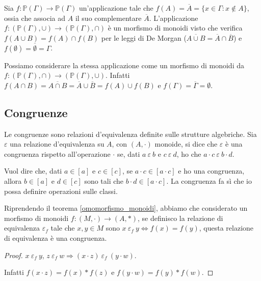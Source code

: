 \begin{exmp}
Sia $f : \mathbb{P}(\Gamma) \to \mathbb{P}(\Gamma)$ un'applicazione tale che $f(A) = \overline{A} = \{ x \in \Gamma : x \notin A\}$, ossia che associa ad $A$ il suo complementare $\overline{A}$. L'applicazione $f : (\mathbb{P}(\Gamma), \cup) \to (\mathbb{P}(\Gamma), \cap)$ \`e un morfismo di monoidi visto che verifica $f(A \cup B) = f(A) \cap f(B)$ per le leggi di De Morgan ($\overline{A \cup B} = \overline{A} \cap \overline{B}$) e $f(\emptyset) = \overline{\emptyset} = \Gamma$.

Possiamo considerare la stessa applicazione come un morfismo di monoidi da $f : (\mathbb{P}(\Gamma), \cap) \to (\mathbb{P}(\Gamma), \cup)$. Infatti $f(A \cap B) = \overline{A \cap B} = \overline{A} \cup \overline{B} = f(A) \cup f(B)$ e $f(\Gamma) = \overline{\Gamma} = \emptyset$.
\end{exmp}

\subsection{Congruenze\label{congruenze}}

\begin{defn}
Le congruenze sono relazioni d'equivalenza definite sulle strutture algebriche. Sia $\varepsilon$ una relazione d'equivalenza su $A$, con $(A, \cdot)$ monoide, si dice che $\varepsilon$ \`e una congruenza rispetto all'operazione $\cdot$ se, dati $a \ \varepsilon \ b$ e $c \ \varepsilon \ d$, ho che $a \cdot c \ \varepsilon \ b \cdot d$.
\end{defn}

Vuol dire che, dati $a \in [a]$ e $c \in [c]$, se $a \cdot c \in [a \cdot c]$ e ho una congruenza, allora $b \in [a]$ e $d \in [c]$ sono tali che $b \cdot d \in [a \cdot c]$. La congruenza fa s\`i che io possa definire operazioni sulle classi.

\begin{prop}
Riprendendo il teorema \ref{omomorfismo_monoidi}, abbiamo che considerato un morfismo di monoidi $f : (M, \cdot) \to (A, \ast)$, se definisco la relazione di equivalenza $\varepsilon_f$ tale che $x, y \in M$ sono $x \ \varepsilon_f \ y \Leftrightarrow f(x) = f(y)$, questa relazione di equivalenza \`e una congruenza.
\end{prop}
\begin{proof}\label{congruenza_monoidi}
$x \ \varepsilon_f \ y$, $z \ \varepsilon_f \ w \Rightarrow (x \cdot z) \ \varepsilon_f \ (y \cdot w)$.

Infatti $f(x \cdot z) = f(x) \ast f(z)$ e $f(y \cdot w) = f(y) \ast f(w)$. 
\end{proof}

